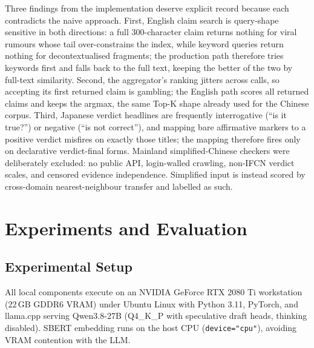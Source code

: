 \documentclass[twoside]{llncs}
\begin{document}
Three findings from the implementation deserve explicit record because each contradicts the naive approach. First, English claim search is query-shape sensitive in both directions: a full $300$-character claim returns nothing for viral rumours whose tail over-constrains the index, while keyword queries return nothing for decontextualised fragments; the production path therefore tries keywords first and falls back to the full text, keeping the better of the two by full-text similarity. Second, the aggregator's ranking jitters across calls, so accepting its first returned claim is gambling; the English path scores all returned claims and keeps the argmax, the same Top-K shape already used for the Chinese corpus. Third, Japanese verdict headlines are frequently interrogative (``is it true?'') or negative (``is not correct''), and mapping bare affirmative markers to a positive verdict misfires on exactly those titles; the mapping therefore fires only on declarative verdict-final forms. Mainland simplified-Chinese checkers were deliberately excluded: no public API, login-walled crawling, non-IFCN verdict scales, and censored evidence independence. Simplified input is instead scored by cross-domain nearest-neighbour transfer and labelled as such.

\section{Experiments and Evaluation}
\label{sec:exp}

\subsection{Experimental Setup}
All local components execute on an NVIDIA GeForce RTX 2080 Ti workstation (22\,GB GDDR6 VRAM) under Ubuntu Linux with Python 3.11, PyTorch, and llama.cpp serving Qwen3.8-27B (Q4\_K\_P with speculative draft heads, thinking disabled). SBERT embedding runs on the host CPU (\texttt{device="cpu"}), avoiding VRAM contention with the LLM.
\end{document}
